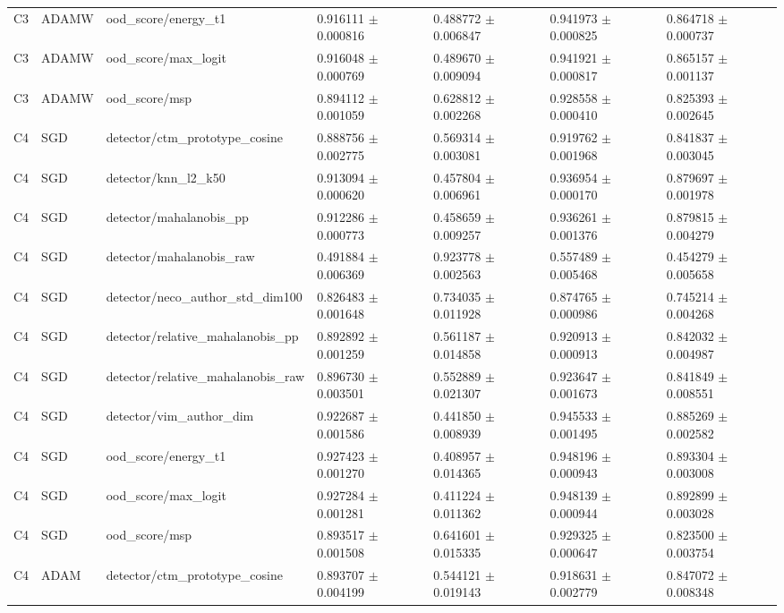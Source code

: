 \begin{longtable}{lllllll}
C3 & ADAMW & ood\_score/energy\_t1 & 0.916111 $\pm$ 0.000816 & 0.488772 $\pm$ 0.006847 & 0.941973 $\pm$ 0.000825 & 0.864718 $\pm$ 0.000737 \\
C3 & ADAMW & ood\_score/max\_logit & 0.916048 $\pm$ 0.000769 & 0.489670 $\pm$ 0.009094 & 0.941921 $\pm$ 0.000817 & 0.865157 $\pm$ 0.001137 \\
C3 & ADAMW & ood\_score/msp & 0.894112 $\pm$ 0.001059 & 0.628812 $\pm$ 0.002268 & 0.928558 $\pm$ 0.000410 & 0.825393 $\pm$ 0.002645 \\
C4 & SGD & detector/ctm\_prototype\_cosine & 0.888756 $\pm$ 0.002775 & 0.569314 $\pm$ 0.003081 & 0.919762 $\pm$ 0.001968 & 0.841837 $\pm$ 0.003045 \\
C4 & SGD & detector/knn\_l2\_k50 & 0.913094 $\pm$ 0.000620 & 0.457804 $\pm$ 0.006961 & 0.936954 $\pm$ 0.000170 & 0.879697 $\pm$ 0.001978 \\
C4 & SGD & detector/mahalanobis\_pp & 0.912286 $\pm$ 0.000773 & 0.458659 $\pm$ 0.009257 & 0.936261 $\pm$ 0.001376 & 0.879815 $\pm$ 0.004279 \\
C4 & SGD & detector/mahalanobis\_raw & 0.491884 $\pm$ 0.006369 & 0.923778 $\pm$ 0.002563 & 0.557489 $\pm$ 0.005468 & 0.454279 $\pm$ 0.005658 \\
C4 & SGD & detector/neco\_author\_std\_dim100 & 0.826483 $\pm$ 0.001648 & 0.734035 $\pm$ 0.011928 & 0.874765 $\pm$ 0.000986 & 0.745214 $\pm$ 0.004268 \\
C4 & SGD & detector/relative\_mahalanobis\_pp & 0.892892 $\pm$ 0.001259 & 0.561187 $\pm$ 0.014858 & 0.920913 $\pm$ 0.000913 & 0.842032 $\pm$ 0.004987 \\
C4 & SGD & detector/relative\_mahalanobis\_raw & 0.896730 $\pm$ 0.003501 & 0.552889 $\pm$ 0.021307 & 0.923647 $\pm$ 0.001673 & 0.841849 $\pm$ 0.008551 \\
C4 & SGD & detector/vim\_author\_dim & 0.922687 $\pm$ 0.001586 & 0.441850 $\pm$ 0.008939 & 0.945533 $\pm$ 0.001495 & 0.885269 $\pm$ 0.002582 \\
C4 & SGD & ood\_score/energy\_t1 & 0.927423 $\pm$ 0.001270 & 0.408957 $\pm$ 0.014365 & 0.948196 $\pm$ 0.000943 & 0.893304 $\pm$ 0.003008 \\
C4 & SGD & ood\_score/max\_logit & 0.927284 $\pm$ 0.001281 & 0.411224 $\pm$ 0.011362 & 0.948139 $\pm$ 0.000944 & 0.892899 $\pm$ 0.003028 \\
C4 & SGD & ood\_score/msp & 0.893517 $\pm$ 0.001508 & 0.641601 $\pm$ 0.015335 & 0.929325 $\pm$ 0.000647 & 0.823500 $\pm$ 0.003754 \\
C4 & ADAM & detector/ctm\_prototype\_cosine & 0.893707 $\pm$ 0.004199 & 0.544121 $\pm$ 0.019143 & 0.918631 $\pm$ 0.002779 & 0.847072 $\pm$ 0.008348 \\

\end{longtable}
